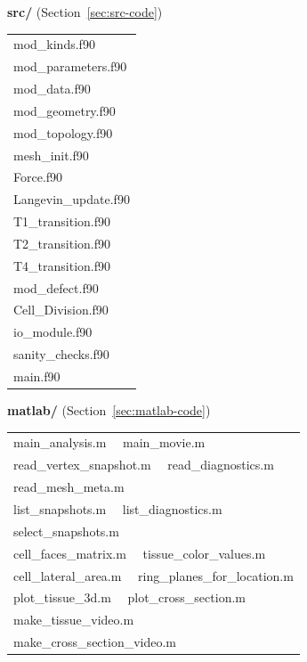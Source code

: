 \documentclass[11pt,a4paper]{report}
\begin{document}
\begin{center}
\begin{minipage}{0.46\textwidth}
\centering \textbf{src/} (Section~\ref{sec:src-code})\vspace{2pt}\\
{\ttfamily\small\begin{tabular}{@{}l@{}}
mod\_kinds.f90\\ mod\_parameters.f90\\ mod\_data.f90\\
mod\_geometry.f90\\ mod\_topology.f90\\ mesh\_init.f90\\
Force.f90\\ Langevin\_update.f90\\ T1\_transition.f90\\
T2\_transition.f90\\ T4\_transition.f90\\ mod\_defect.f90\\
Cell\_Division.f90\\
io\_module.f90\\ sanity\_checks.f90\\ main.f90
\end{tabular}}
\end{minipage}%
\begin{minipage}{0.5\textwidth}
\centering \textbf{matlab/} (Section~\ref{sec:matlab-code})\vspace{2pt}\\
{\ttfamily\small\begin{tabular}{@{}l@{}}
main\_analysis.m \ \ main\_movie.m\\
read\_vertex\_snapshot.m \ \ read\_diagnostics.m\\
read\_mesh\_meta.m\\
list\_snapshots.m \ \ list\_diagnostics.m\\
select\_snapshots.m\\
cell\_faces\_matrix.m \ \ tissue\_color\_values.m\\
cell\_lateral\_area.m \ \ ring\_planes\_for\_location.m\\
plot\_tissue\_3d.m \ \ plot\_cross\_section.m\\
make\_tissue\_video.m\\
make\_cross\_section\_video.m
\end{tabular}}
\end{minipage}
\end{center}
\end{document}
